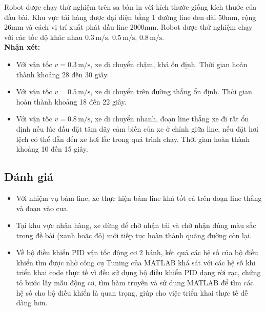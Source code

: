           \hspace*{0.6cm}Robot được chạy thử nghiệm trên sa bàn in với kích thước giống kích thước của đầu bài. Khu vực tải hàng được đại diện bằng 1 đường line đen dài 50mm, rộng 26mm và cách vị trí xuất phát đầu line 2000mm. Robot được thử nghiệm chạy với các tốc độ khác nhau $0.3 \,\mathrm{m/s}, \,  0.5 \,\mathrm{m/s}, \, 0.8 \,\mathrm{m/s}$.\\
               \hspace*{0.6cm}\textbf{Nhận xét:}
               \begin{itemize}
                    \item Với vận tốc $v = 0.3 \,\mathrm{m/s}$, xe di chuyển chậm, khá ổn định. Thời gian hoàn thành khoảng 28 đến 30 giây.
                    \item Với vận tốc $v = 0.5 \,\mathrm{m/s}$, xe di chuyển trên đường thẳng ổn định. Thời gian hoàn thành khoảng 18 đến 22 giây.
                    \item Với vận tốc $v = 0.8 \,\mathrm{m/s}$, xe di chuyển nhanh, đoạn line thẳng xe đi rất ổn định nếu lúc đầu đặt tâm dãy cảm biến của xe ở chính giữa line, nếu đặt hơi lệch có thể dẫn đến xe hơi lắc trong quá trình chạy. Thời gian hoàn thành khoảng 10 đến 15 giây.
               \end{itemize}
          \subsection{Đánh giá}
               \begin{itemize}
                    \item Với nhiệm vụ bám line, xe thực hiện bám line khá tốt cả trên đoạn line thẳng và đoạn vào cua.
                    \item Tại khu vực nhận hàng, xe dừng để chờ nhận tải và chờ nhận đúng màu sắc trong đề bài (xanh hoặc đỏ) mới tiếp tục hoàn thành quãng đường còn lại.
                    \item Về bộ điều khiển PID vận tốc động cơ 2 bánh, kết quả các hệ số của bộ điều khiển tìm được nhờ công cụ Tuning của MATLAB khá sát với các hệ số khi triển khai code thực tế vì đều sử dụng bộ điều khiển PID dạng rời rạc, chứng tỏ bước lấy mẫu động cơ, tìm hàm truyền và sử dụng MATLAB để tìm các hệ số cho bộ điều khiển là quan trọng, giúp cho việc triển khai thực tế dễ dàng hơn. 
               \end{itemize}
